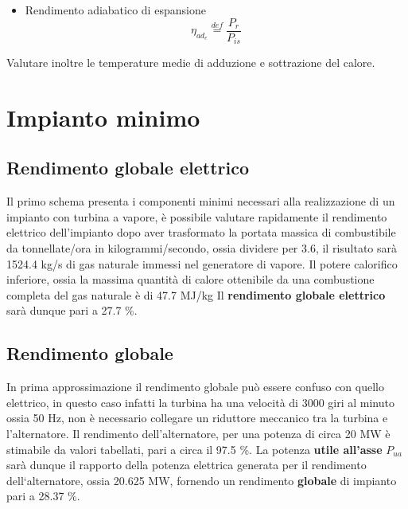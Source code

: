 \documentclass[a4paper,12pt]{article}
\begin{document}
\begin{itemize}
   \item Rendimento adiabatico di espansione
   \begin{equation}
        \label{eq:rendimento_adiabatico}
        \eta_{ad_e} \stackrel{def}{=} \frac{P_r}{P_{is}}
    \end{equation}
\end{itemize}
Valutare inoltre le temperature medie di adduzione e sottrazione del calore.

\section{Impianto minimo}
\label{sec:primo_impianto}
\subsection{Rendimento globale elettrico}
\label{subsec:rendimento_globale_elettrico}
Il primo schema presenta i componenti minimi necessari alla realizzazione di un impianto con turbina a vapore,
è possibile valutare rapidamente il rendimento elettrico dell'impianto dopo aver trasformato la portata massica di combustibile da 
tonnellate/ora in kilogrammi/secondo, ossia dividere per 3.6, il risultato sarà 1524.4 kg/s di gas naturale immessi nel generatore di vapore.
Il potere calorifico inferiore, ossia la massima quantità di calore ottenibile da una combustione completa del gas naturale è di 47.7 MJ/kg
Il \textbf{rendimento globale elettrico} sarà dunque pari a 27.7 \%.

\subsection{Rendimento globale}
\label{subsec:rendimento_globale}
In prima approssimazione il rendimento globale può essere confuso con quello elettrico, in questo caso infatti la turbina ha una velocità
di 3000 giri al minuto ossia 50 Hz, non è necessario collegare un riduttore meccanico tra la turbina e l'alternatore.
Il rendimento dell'alternatore, per una potenza di circa 20 MW è stimabile da valori tabellati, pari a circa il 97.5 \%.
La potenza \textbf{utile all'asse} $P_{ua}$ sarà dunque il rapporto della potenza elettrica generata per il rendimento dell`alternatore, ossia
20.625 MW, fornendo un rendimento \textbf{globale} di impianto pari a 28.37 \%. 
\end{document}
